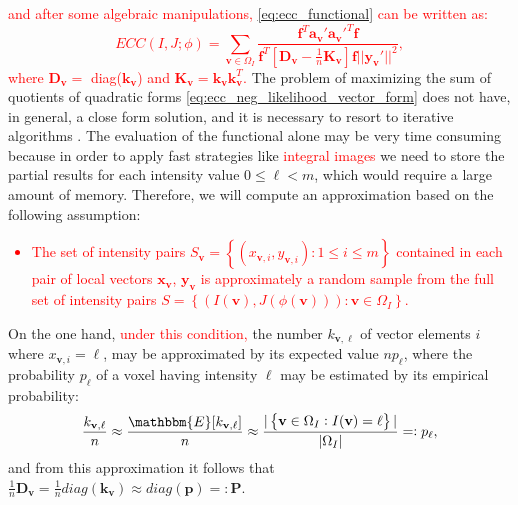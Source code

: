 \textcolor{red}{and after some algebraic manipulations, \eqref{eq:ecc_functional} can be written as:
\begin{equation}\label{eq:ecc_neg_likelihood_vector_form}
    ECC(I, J;\phi) = \sum_{\mathbf{v} \in \Omega_{I}}\frac{\mathbf{f}^{T}\mathbf{a_{v}'}\mathbf{a_{v}'}^{T}\mathbf{f}}{\mathbf{f}^{T} \left[ \mathbf{D_{v}} - \frac{1}{n}\mathbf{K_{v}}\right]\mathbf{f} ||\mathbf{y_{v}'}||^{2}},
\end{equation}
where $\mathbf{D}_{\mathbf{v}} = $ diag($\mathbf{k}_{\mathbf{v}}$) and $\mathbf{K_{v}} = \mathbf{k_{v}}\mathbf{k}^{T}_{\mathbf{v}}$.} The problem of maximizing the sum of quotients of quadratic forms \eqref{eq:ecc_neg_likelihood_vector_form} does not have, in general, a close form solution, and it is necessary to resort to iterative algorithms \cite{Kiers1995}. The evaluation of the functional alone may be very time consuming because in order to apply fast strategies like \textcolor{red}{integral images \cite{Crow1984}\cite{Viola2004}\cite{Tapia2011}} we need to store the partial results for each intensity value $0 \leq \ell < m$, which would require a large amount of memory. Therefore, we will compute an approximation based on the following assumption:
\textcolor{red}{\begin{itemize}
    \item The set of intensity pairs $S_{\mathbf{v}}=\left\lbrace \left(x_{\mathbf{v}, i}, y_{\mathbf{v}, i}\right): 1\leq i \leq m\right\rbrace$ contained in each pair of local vectors $\mathbf{x}_{\mathbf{v}}$, $\mathbf{y}_{\mathbf{v}}$ is approximately a random sample from the full set of intensity pairs $S=\left\lbrace \left(I(\mathbf{v}), J(\phi(\mathbf{v}))\right): \mathbf{v}\in \Omega_{I}\right\rbrace$.
\end{itemize}}
On the one hand, \textcolor{red}{under this condition,} the number $k_{\mathbf{v},\ell}$ of vector elements $i$ where $x_{\mathbf{v},i} = \ell$, may be approximated by its expected value $np_{\ell}$, where the probability $p_{\ell}$ of a voxel having intensity $\ell$ may be estimated by its empirical probability:
\begin{equation}
    \frac{k_{\mathbf{v}, \ell}}{n} \approx \frac{\mathbbm{E}[k_{\mathbf{v},\ell}]}{n} \approx \frac{|\left\lbrace \mathbf{v}\in\Omega_{I} : I(\mathbf{v}) = \ell\right\rbrace|}{|\Omega_{I}|} =: p_{\ell},
\end{equation}
and from this approximation it follows that $\frac{1}{n}\mathbf{D}_{\mathbf{v}} = \frac{1}{n}diag(\mathbf{k}_{\mathbf{v}}) \approx diag(\mathbf{p}) =: \mathbf{P}$.\\

